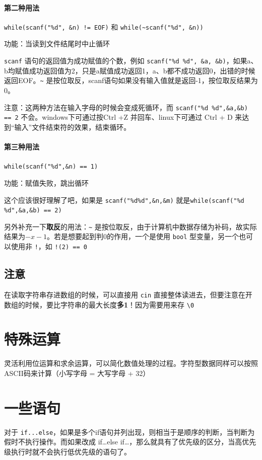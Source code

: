 \documentclass[]{report}
\begin{document}
		\paragraph{第二种用法} \verb|while(scanf("%d", &n) != EOF)| 和 \verb|while(~scanf("%d", &n))|\par
			功能：当读到文件结尾时中止循环\par
			\verb|scanf| 语句的返回值为成功赋值的个数，例如 \verb|scanf("%d %d", &a, &b)|，如果a、b均赋值成功返回值为2，只是a赋值成功返回1，a、b都不成功返回0，出错的时候返回EOF。\verb|~| 是按位取反，scanf语句如果没有输入值就是返回-1，按位取反结果为0。\par
			注意：这两种方法在输入字母的时候会变成死循环，而 \verb|scanf("%d %d",&a,&b) == 2| 不会。windows下可通过按Ctrl +Z 并回车、linux下可通过 Ctrl + D 来达到“输入”文件结束符的效果，结束循环。
		\paragraph{第三种用法} \verb|while(scanf("%d",&n) == 1)|\par
			功能：赋值失败，跳出循环\par
			这个应该很好理解了吧，如果是 \verb|scanf("%d%d",&n,&m)| 就是\newline \verb|while(scanf("%d %d",&a,&b) == 2)|\par
			另外补充一下\textbf{取反}的用法：\verb|~| 是按位取反，由于计算机中数据存储为补码，故实际结果为$-x-1$。若是想要起到判0的作用，一个是使用 \verb|bool| 型变量，另一个也可以使用非 \verb|!|，如 \verb|!(2) == 0|
		\subsection{注意}
		在读取字符串存进数组的时候，可以直接用 \verb|cin| 直接整体读进去，但要注意在开数组的时候，要比字符串的最大长度\textbf{多1}！因为需要用来存 \verb|\0|
	\section{特殊运算}
		灵活利用位运算和求余运算，可以简化数值处理的过程。字符型数据同样可以按照ASCII码来计算（小写字母 = 大写字母 + 32）
	\section{一些语句}
		对于 \verb|if...else|，如果是多个if语句并列出现，则相当于是顺序的判断，当判断为假时不执行操作。而如果改成 if\dots else if\dots ，那么就具有了优先级的区分，当高优先级执行时就不会执行低优先级的语句了。
\end{document}
